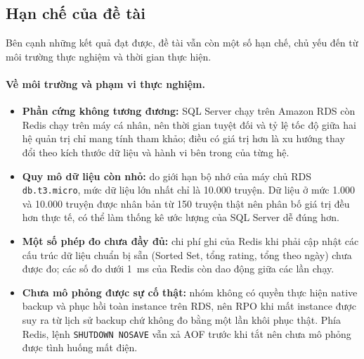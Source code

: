 \subsection{Hạn chế của đề tài}
\label{subsec:conclusion-limitations}

Bên cạnh những kết quả đạt được, đề tài vẫn còn một số hạn chế, chủ yếu đến từ môi trường thực nghiệm và thời gian thực hiện.

\paragraph{Về môi trường và phạm vi thực nghiệm.}
\begin{itemize}
    \item \textbf{Phần cứng không tương đương:} SQL Server chạy trên Amazon RDS còn Redis chạy trên máy cá nhân, nên thời gian tuyệt đối và tỷ lệ tốc độ giữa hai hệ quản trị chỉ mang tính tham khảo; điều có giá trị hơn là xu hướng thay đổi theo kích thước dữ liệu và hành vi bên trong của từng hệ.
    \item \textbf{Quy mô dữ liệu còn nhỏ:} do giới hạn bộ nhớ của máy chủ RDS \texttt{db.t3.micro}, mức dữ liệu lớn nhất chỉ là 10.000 truyện. Dữ liệu ở mức 1.000 và 10.000 truyện được nhân bản từ 150 truyện thật nên phân bố giá trị đều hơn thực tế, có thể làm thống kê ước lượng của SQL Server dễ đúng hơn.
    \item \textbf{Một số phép đo chưa đầy đủ:} chi phí ghi của Redis khi phải cập nhật các cấu trúc dữ liệu chuẩn bị sẵn (Sorted Set, tổng rating, tổng theo ngày) chưa được đo; các số đo dưới 1~ms của Redis còn dao động giữa các lần chạy.
    \item \textbf{Chưa mô phỏng được sự cố thật:} nhóm không có quyền thực hiện native backup và phục hồi toàn instance trên RDS, nên RPO khi mất instance được suy ra từ lịch sử backup chứ không đo bằng một lần khôi phục thật. Phía Redis, lệnh \texttt{SHUTDOWN NOSAVE} vẫn xả AOF trước khi tắt nên chưa mô phỏng được tình huống mất điện.
\end{itemize}

